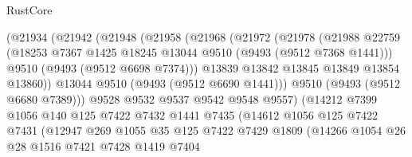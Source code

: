 \begin{lexlean}{RustCore}
\begin{coremodule}
                      (@21934
                        (@21942
                          (@21948
                            (@21958
                              (@21968
                                (@21972
                                  (@21978
                                    (@21988
                                      @22759
                                      (@18253
                                        @7367
                                        @1425
                                        @18245
                                        @13044
                                        @9510
                                        (@9493 (@9512 @7368 @1441)))
                                      @9510
                                      (@9493 (@9512 @6698 @7374)))
                                    @13839
                                    @13842
                                    @13845
                                    @13849
                                    @13854
                                    @13860))
                                @13044
                                @9510
                                (@9493 (@9512 @6690 @1441)))
                              @9510
                              (@9493 (@9512 @6680 @7389)))
                            @9528
                            @9532
                            @9537
                            @9542
                            @9548
                            @9557)
                          (@14212
                            @7399
                            @1056
                            @140
                            @125
                            @7422
                            @7432
                            @1441
                            @7435
                            (@14612
                              @1056
                              @125
                              @7422
                              @7431
                              (@12947
                                @269
                                @1055
                                @35
                                @125
                                @7422
                                @7429
                                @1809
                                (@14266
                                  @1054
                                  @26
                                  @28
                                  @1516
                                  @7421
                                  @7428
                                  @1419
                                  @7404

\end{coremodule}
\end{lexlean}
